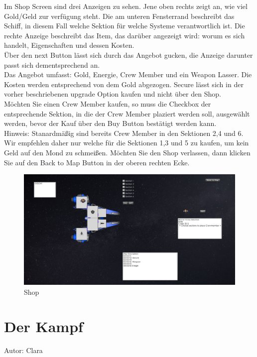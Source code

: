 \documentclass[fontsize=12pt,paper=a4,twoside]{scrartcl}
\begin{document}
Im Shop Screen sind drei Anzeigen zu sehen. Jene oben rechts zeigt an, wie viel Gold/Geld zur verfügung steht. Die am unteren Fensterrand beschreibt das Schiff, in diesem Fall welche Sektion für welche Systeme verantwortlich ist. Die rechte Anzeige beschreibt das Item, das darüber angezeigt wird: worum es sich handelt, Eigenschaften und dessen Kosten.\\
Über den next Button lässt sich durch das Angebot gucken, die Anzeige darunter passt sich dementsprechend an.\\
Das Angebot umfasst: Gold, Energie, Crew Member und ein Weapon Lasser. Die Kosten werden entsprechend von dem Gold abgezogen. Secure lässt sich in der vorher beschriebenen upgrade Option kaufen und nicht über den Shop.\\
Möchten Sie einen Crew Member kaufen, so muss die Checkbox der entsprechende Sektion, in die der Crew Member plaziert werden soll, ausgewählt werden, bevor der Kauf über den Buy Button bestätigt werden kann. \\
Hinweis: Stanardmäßig sind bereits Crew Member in den Sektionen 2,4 und 6. Wir empfehlen daher nur welche für die Sektionen 1,3 und 5 zu kaufen, um kein Geld auf den Mond zu schmeißen.
Möchten Sie den Shop verlassen, dann klicken Sie auf den Back to Map Button in der oberen rechten Ecke. 

\begin{figure}[htp]
	\centering
	\includegraphics[width=1.00\linewidth]{pics/shopScreen.png} %
	\caption{Shop}
	\label{fig1}
\end{figure}

\section{Der Kampf}
Autor: Clara\\
\end{document}
